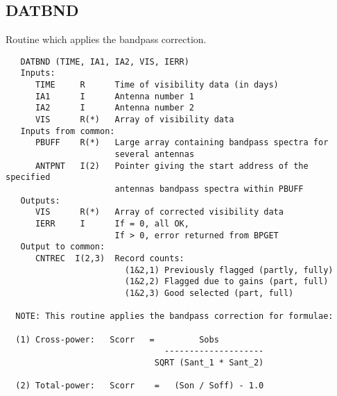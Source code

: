 \subsection{DATBND}
Routine which applies the bandpass correction.
\begin{verbatim}
   DATBND (TIME, IA1, IA2, VIS, IERR)
   Inputs:
      TIME     R      Time of visibility data (in days)
      IA1      I      Antenna number 1
      IA2      I      Antenna number 2
      VIS      R(*)   Array of visibility data
   Inputs from common:
      PBUFF    R(*)   Large array containing bandpass spectra for
                      several antennas
      ANTPNT   I(2)   Pointer giving the start address of the specified
                      antennas bandpass spectra within PBUFF
   Outputs:
      VIS      R(*)   Array of corrected visibility data
      IERR     I      If = 0, all OK,
                      If > 0, error returned from BPGET
   Output to common:
      CNTREC  I(2,3)  Record counts:
                        (1&2,1) Previously flagged (partly, fully)
                        (1&2,2) Flagged due to gains (part, full)
                        (1&2,3) Good selected (part, full)

  NOTE: This routine applies the bandpass correction for formulae:

  (1) Cross-power:   Scorr   =         Sobs
                                --------------------
                              SQRT (Sant_1 * Sant_2)

  (2) Total-power:   Scorr    =   (Son / Soff) - 1.0
\end{verbatim}

